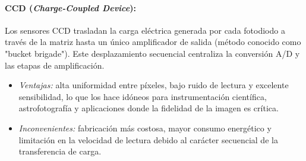\begin{marginfigure}
\caption[Comparativa de sensores CCD y CMOS.]{%
    Comparativa de sensores CCD y CMOS. El sensor CCD transfiere la carga de cada pixel a través de un proceso secuencial (bucket brigade) hacia un único amplificador y ADC, lo que puede generar ruido adicional y limitaciones en velocidad. En contraste, el sensor CMOS integra amplificadores y ADCs dentro de cada pixel, permitiendo lecturas aleatorias, mayor velocidad y menor consumo energético, aunque con una complejidad de diseño superior.}\label{fig:ccd_cmos}
\end{marginfigure}

\paragraph{CCD (\textit{Charge-Coupled Device}):}\label{par:ccd}
Los sensores CCD trasladan la carga eléctrica generada por cada fotodiodo a través de la matriz hasta un único amplificador de salida (método conocido como "bucket brigade"). Este desplazamiento secuencial centraliza la conversión A/D y las etapas de amplificación.
\begin{itemize}
    \item \emph{Ventajas:} alta uniformidad entre píxeles, bajo ruido de lectura y excelente sensibilidad, lo que los hace idóneos para instrumentación científica, astrofotografía y aplicaciones donde la fidelidad de la imagen es crítica.
    \item \emph{Inconvenientes:} fabricación más costosa, mayor consumo energético y limitación en la velocidad de lectura debido al carácter secuencial de la transferencia de carga.
\end{itemize}

